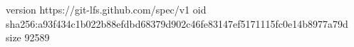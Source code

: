 version https://git-lfs.github.com/spec/v1
oid sha256:a93f434c1b022b88efdbd68379d902c46fe83147ef5171115fc0e14b8977a79d
size 92589
